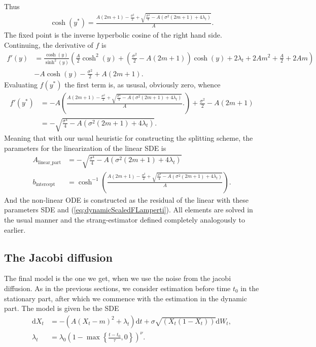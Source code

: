 Thus
\begin{align}
    \cosh(y^*) = \frac{A\left(2m + 1\right) - \frac{\sigma^2}{2} + \sqrt{\frac{\sigma^4}{4}-A\left(\sigma^2\left(2m + 1\right) + 4 \lambda_t\right)}}{A}.
\end{align}
The fixed point is the inverse hyperbolic cosine of the right hand side. Continuing, the derivative of $f$ is
\begin{align}
    f'(y) &= \frac{\cosh(y)}{\sinh^2\left(y\right)}\left(\frac{A}{2}\cosh^2\left(y\right) + \left(\frac{\sigma^2}{2} - A \left(2m + 1\right)\right)\cosh\left(y\right) + 2\lambda_t + 2Am^2 + \frac{A}{2} + 2Am\right) \nonumber\\
    &-A\cosh(y) - \frac{\sigma^2}{2} + A \left(2m + 1\right).
\end{align}
Evaluating $f(y^*)$ the first term is, as ususal, obviously zero, whence
\begin{align}
    f'(y^*) &= -A\left(\frac{A\left(2m + 1\right) - \frac{\sigma^2}{2} + \sqrt{\frac{\sigma^4}{4}-A\left(\sigma^2\left(2m + 1\right) + 4 \lambda_t\right)}}{A}.\right) + \frac{\sigma^2}{2} - A \left(2m + 1\right) \nonumber \\
    &= - \sqrt{\frac{\sigma^4}{4}-A\left(\sigma^2\left(2m + 1\right) + 4 \lambda_t\right)}.
\end{align}
Meaning that with our usual heuristic for constructing the splitting scheme, the parameters for the linearization of the linear SDE is
\begin{align}
    A_{\mathrm{linear\_part}} &= -\sqrt{\frac{\sigma^4}{4} - A \left(\sigma^2\left(2m + 1\right) + 4\lambda_t\right)}\\
    b_{\mathrm{intercept}} &= \cosh^{-1}\left(\frac{A\left(2m + 1\right) - \frac{\sigma^2}{2} + \sqrt{\frac{\sigma^4}{4}-A\left(\sigma^2\left(2m + 1\right) + 4 \lambda_t\right)}}{A}\right). \label{eq:FscaledSplitting}
\end{align}
And the non-linear ODE is constructed as the residual of the linear with these parameters SDE and (\ref{eq:dynamicScaledFLamperti}). All elements are solved in the usual manner and the strang-estimator defined completely analogously to earlier.\newpage
\subsection{The Jacobi diffusion}
The final model is the one we get, when we use the noise from the jacobi diffusion. As in the previous sections, we consider estimation before time $t_0$ in the stationary part, after which we commence with the estimation in the dynamic part. The model is given be the SDE
\begin{align}
    \mathrm{d}X_t &= -\left(A\left(X_t - m\right)^2 + \lambda_t\right)\mathrm{d}t + \sigma \sqrt{\left(X_t\left(1 - X_t\right)\right)} \mathrm{d}W_t,\\
    \lambda_t &= \lambda_0\left(1 - \max\left\{\frac{t - t_0}{\tau}, 0\right\}\right)^\nu.
\end{align}
